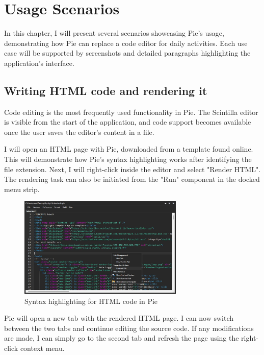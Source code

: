 \chapter{Usage Scenarios}
\thispagestyle{pagestyle}

In this chapter, I will present several scenarios showcasing Pie's usage, demonstrating how Pie can replace a code editor for daily activities. Each use case will be supported by screenshots and detailed paragraphs highlighting the application's interface.

\section{Writing HTML code and rendering it}

Code editing is the most frequently used functionality in Pie. The Scintilla editor is visible from the start of the application, and code support becomes available once the user saves the editor's content in a file.

I will open an HTML page with Pie, downloaded from a template found online. This will demonstrate how Pie's syntax highlighting works after identifying the file extension. Next, I will right-click inside the editor and select "Render HTML". The rendering task can also be initiated from the "Run" component in the docked menu strip.

\begin{figure}[h]
\centering
\includegraphics[width=0.7\textwidth]{images/render-context-menu.jpg}
\caption{Syntax highlighting for HTML code in Pie}
\label{fig:fig2,1.}
\end{figure}

Pie will open a new tab with the rendered HTML page. I can now switch between the two tabs and continue editing the source code. If any modifications are made, I can simply go to the second tab and refresh the page using the right-click context menu.

